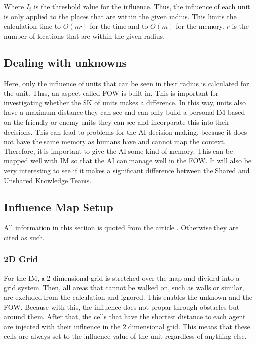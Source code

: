 \documentclass[]{report}
\begin{document}
	Where $I_t$ is the threshold value for the influence. Thus, the influence of each unit is only applied to the places that are within the given radius. This limits the calculation time to $O(nr)$ for the time and to $O(m)$ for the memory. $r$ is the number of locations that are within the given radius.
	
	\subsection{Dealing with unknowns} \label{ssec:dwu}
	Here, only the influence of units that can be seen in their radius is calculated for the unit. Thus, an aspect called \ac{FOW} is built in. This is important for investigating whether the \ac{SK} of units makes a difference. In this way, units also have a maximum distance they can see and can only build a personal \ac{IM} based on the friendly or enemy units they can see and incorporate this into their decisions. This can lead to problems for the \ac{AI} decision making, because it does not have the same memory as humans have and cannot map the context. Therefore, it is important to give the \ac{AI} some kind of memory. This can be mapped well with IM so that the \ac{AI} can manage well in the \ac{FOW}. It will also be very interesting to see if it makes a significant difference between the Shared and Unshared Knowledge Teams.
	
	\subsection{Influence Map Setup}
	All information in this section is quoted from the article \citep{gameDevInfluenceMap}. Otherwise they are cited as such. \newline
	
	\subsubsection{2D Grid} \label{2dgrid}
	For the \ac{IM}, a 2-dimensional grid is stretched over the map and divided into a grid system. Then, all areas that cannot be walked on, such as walls or similar, are excluded from the calculation and ignored. This enables the unknown and the \ac{FOW}. Because with this, the influence does not propar through obstacles but around them. After that, the cells that have the shortest distance to each agent are injected with their influence in the 2 dimensional grid. This means that these cells are always set to the influence value of the unit regardless of anything else. 
	
\end{document}
